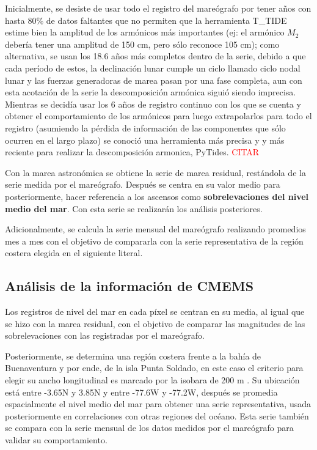 Inicialmente, se desiste de usar todo el registro del mareógrafo por tener años con hasta 80\% de datos faltantes que no permiten que la herramienta T\_TIDE estime bien la amplitud de los armónicos más importantes (ej: el armónico $M_{2}$ debería tener una amplitud de 150 cm, pero sólo reconoce 105 cm); como alternativa, se usan los 18.6 años más completos dentro de la serie, debido a que cada período de estos, la declinación lunar cumple un ciclo llamado ciclo nodal lunar y las fuerzas generadoras de marea pasan por una fase completa, aun con esta acotación de la serie la descomposición armónica siguió siendo imprecisa. Mientras se decidía usar los 6 años de registro continuo con los que se cuenta y obtener el comportamiento de los armónicos para luego extrapolarlos para todo el registro (asumiendo la pérdida de información de las componentes que sólo ocurren en el largo plazo) se conoció una herramienta más precisa y y más reciente para realizar la descomposición armonica, PyTides. \textcolor{red}{CITAR}

Con la marea astronómica se obtiene la serie de marea residual, restándola de la serie medida por el mareógrafo. Después se centra en su valor medio para posteriormente, hacer referencia a los ascensos como \textbf{sobrelevaciones del nivel medio del mar}. Con esta serie se realizarán los análisis posteriores.

Adicionalmente, se calcula la serie mensual del mareógrafo realizando promedios mes a mes con el objetivo de compararla con la serie representativa de la región costera elegida en el siguiente literal.

\subsection{Análisis de la información de CMEMS} \label{sec:1}
Los registros de nivel del mar en cada píxel se centran en su media, al igual que se hizo con la marea residual, con el objetivo de comparar las magnitudes de las sobrelevaciones con las registradas por el mareógrafo.

Posteriormente, se determina una región costera frente a la bahía de Buenaventura y por ende, de la isla Punta Soldado, en este caso el criterio para elegir su ancho longitudinal es marcado por la isobara de 200 m \cite{Montagut2012}. Su ubicación está entre -3.65\textdegree N y 3.85\textdegree N y entre -77.6\textdegree W y -77.2\textdegree W, después se promedia espacialmente el nivel medio del mar para obtener una serie representativa, usada posteriormente en correlaciones con otras regiones del océano. Esta serie también se compara con la serie mensual de los datos medidos por el mareógrafo para validar su comportamiento.


